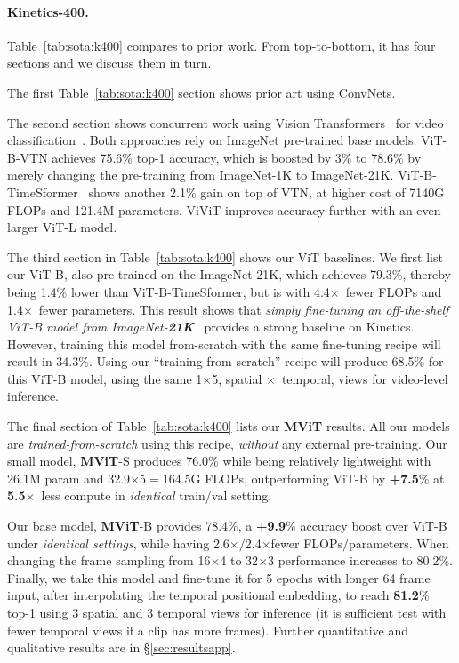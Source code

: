 \documentclass[10pt,twocolumn,letterpaper]{article}
\newcommand{\tblref}[1]{Table~\ref{#1}}
\def\x{$\times$}
\begin{document}
\paragraph{Kinetics-400.} \tblref{tab:sota:k400} compares to prior work. 
From top-to-bottom, it has four sections and we discuss them in turn. 

The first \tblref{tab:sota:k400} section shows prior art using ConvNets. 

The second section shows concurrent work using Vision Transformers~\cite{dosovitskiy2020image} for video classification~\cite{neimark2021video,bertasius2021space}. Both approaches rely on ImageNet pre-trained base models. ViT-B-VTN \cite{neimark2021video} achieves 75.6\% top-1 accuracy, which is boosted by 3\% to 78.6\% by merely changing the pre-training from ImageNet-1K to ImageNet-21K. ViT-B-TimeSformer~\cite{bertasius2021space} shows another 2.1\% gain on top of VTN, at higher cost of 7140G FLOPs and 121.4M parameters. ViViT improves accuracy further with an even larger ViT-L model.

The third section in  \tblref{tab:sota:k400} shows our ViT baselines. We first list our ViT-B, also pre-trained on the ImageNet-21K, which achieves 79.3\%, thereby being 1.4\% lower than ViT-B-TimeSformer, but is with 4.4\x~fewer FLOPs and 1.4\x~fewer parameters. This result shows that \textit{simply fine-tuning an off-the-shelf ViT-B model from ImageNet-\textbf{21K}}~\cite{dosovitskiy2020image} provides a strong baseline on Kinetics. However, training this model from-scratch with the same fine-tuning recipe will result in 34.3\%. Using our ``training-from-scratch'' recipe will produce 68.5\% for this ViT-B model, using the  same 1\x5, spatial \x~temporal, views for video-level inference. 

The final section of \tblref{tab:sota:k400} lists our \textbf{MViT} results. All our models are \textit{trained-from-scratch} using this recipe, \textit{without} any external pre-training. Our small model, \mbox{\textbf{MViT}-S} produces 76.0\% while being relatively lightweight with  26.1M param and 32.9\x5${=}$164.5G FLOPs, outperforming ViT-B by \textbf{+7.5}\% at \textbf{5.5}\x~less compute in \textit{identical} train/val setting. 

Our base model, \textbf{MViT}-B provides 78.4\%, a \textbf{+9.9}\% accuracy boost over ViT-B under \textit{identical settings}, while having 2.6\x$/$2.4\x fewer FLOPs$/$parameters. When changing the frame sampling from 16\x4 to  32\x3 performance increases to 80.2\%. Finally, we take this model and fine-tune it for 5 epochs with longer 64 frame input, after interpolating the temporal positional embedding, to reach \textbf{81.2}\% top-1 using 3 spatial and 3 temporal views for inference (it is sufficient test with fewer temporal views if a clip has more frames).
Further quantitative and qualitative results are in \S\ref{sec:resultsapp}.
\end{document}
